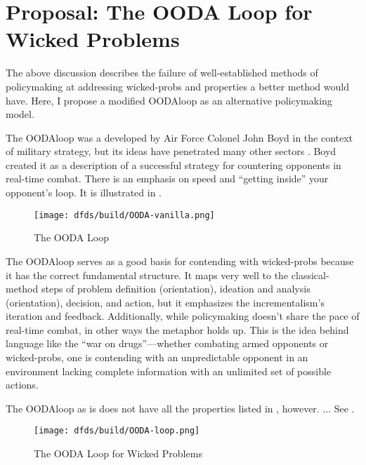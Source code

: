 \wickedtipsend


\section{Proposal: The OODA Loop for Wicked Problems}

The above discussion describes the failure of well-established methods of policymaking at addressing \acp{wicked-prob}
and properties a better method would have. Here, I propose a modified \acs{OODAloop} as an alternative policymaking
model.

The \ac{OODAloop} was a developed by Air Force Colonel John Boyd in the context of military strategy, but its ideas have
penetrated many other sectors \cite{angerman_2004}. Boyd created it as a description of a successful strategy for
countering opponents in real-time combat. There is an emphasis on speed and ``getting inside'' your opponent's loop. It
is illustrated in .

\begin{figure}[h]
    \centering\CaptionFontSize
    \texttt{[image: dfds/build/OODA-vanilla.png]}
    \caption[The OODA Loop]{The OODA Loop}
    \label{fig-ooda-loop}
\end{figure}

The \ac{OODAloop} serves as a good basis for contending with \acp{wicked-prob} because it has the correct fundamental
structure. It maps very well to the \ac{classical-method} steps of problem definition (orientation), ideation and
analysis (orientation), decision, and action, but it emphasizes the \ac{incrementalism}'s iteration and feedback.
Additionally, while policymaking doesn't share the pace of real-time combat, in other ways the metaphor holds up. This
is the idea behind language like the ``war on drugs''---whether combating armed opponents or \acp{wicked-prob}, one is
contending with an unpredictable opponent in an environment lacking complete information with an unlimited set of
possible actions.

The \ac{OODAloop} as is does not have all the properties listed in , however.
... %
See .

\begin{figure}[h]
    \centering\CaptionFontSize
    \texttt{[image: dfds/build/OODA-loop.png]}
    \caption[The OODA Loop for Wicked Problems]{The OODA Loop for Wicked Problems}
    \label{fig-policy-ooda-loop}
\end{figure}
